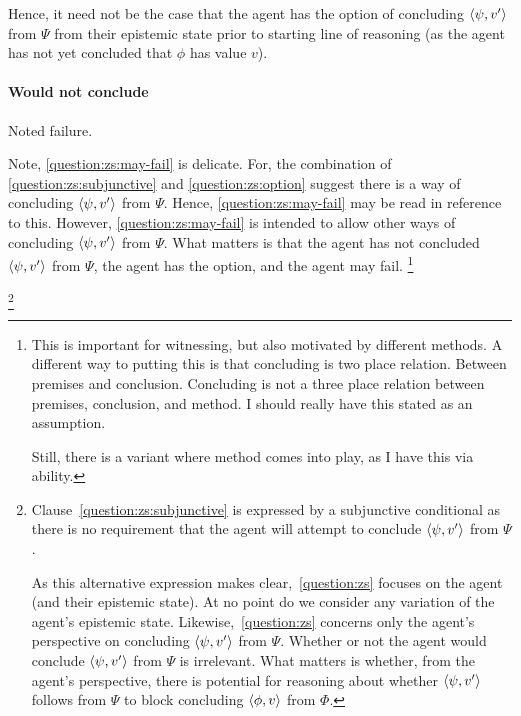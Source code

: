 \begin{note}
  Hence, it need not be the case that the agent has the option of concluding \(\langle \psi, v' \rangle\) from \(\Psi\) from their epistemic state prior to starting line of reasoning (as the agent has not yet concluded that \(\phi\) has value \(v\)).
\end{note}


\paragraph{Would not conclude}

\begin{note}
  Noted failure.
\end{note}

{
  \color{red}
  Note, \ref{question:zs:may-fail} is delicate.
  For, the combination of \ref{question:zs:subjunctive} and \ref{question:zs:option} suggest there is a way of concluding \(\langle \psi, v' \rangle\) from \(\Psi\).
  Hence, \ref{question:zs:may-fail} may be read in reference to this.
  However, \ref{question:zs:may-fail} is intended to allow other ways of concluding \(\langle \psi, v' \rangle\) from \(\Psi\).
  What matters is that the agent has not concluded \(\langle \psi, v' \rangle\) from \(\Psi\), the agent has the option, and the agent may fail.%
  \footnote{
    This is important for witnessing, but also motivated by different methods.
    A different way to putting this is that concluding is two place relation.
    Between premises and conclusion.
    Concluding is not a three place relation between premises, conclusion, and method.
    I should really have this stated as an assumption.

    Still, there is a variant where method comes into play, as I have this via ability.
  }
}

\footnote{
            Clause~\ref{question:zs:subjunctive} is expressed by a subjunctive conditional as there is no requirement that the agent will attempt to conclude \(\langle \psi, v' \rangle\) from \(\Psi\).

            \color{red}
            As this alternative expression makes clear,~\autoref{question:zs} focuses on the agent (and their epistemic state).
            At no point do we consider any variation of the agent's epistemic state.
            Likewise,~\autoref{question:zs} concerns only the agent's perspective on concluding \(\langle \psi, v' \rangle\) from \(\Psi\).
            Whether or not the agent would conclude \(\langle \psi, v' \rangle\) from \(\Psi\) is irrelevant.
            What matters is whether, from the agent's perspective, there is potential for reasoning about whether \(\langle \psi, v' \rangle\) follows from \(\Psi\) to block concluding \(\langle \phi, v \rangle\) from \(\Phi\).
          }

